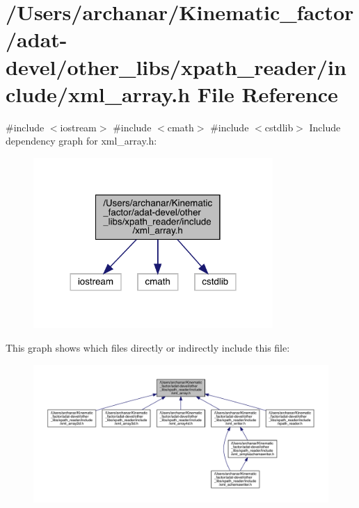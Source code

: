 \hypertarget{adat-devel_2other__libs_2xpath__reader_2include_2xml__array_8h}{}\section{/\+Users/archanar/\+Kinematic\+\_\+factor/adat-\/devel/other\+\_\+libs/xpath\+\_\+reader/include/xml\+\_\+array.h File Reference}
\label{adat-devel_2other__libs_2xpath__reader_2include_2xml__array_8h}
{\ttfamily \#include $<$iostream$>$}\newline
{\ttfamily \#include $<$cmath$>$}\newline
{\ttfamily \#include $<$cstdlib$>$}\newline
Include dependency graph for xml\+\_\+array.\+h\+:
\nopagebreak
\begin{figure}[H]
\begin{center}
\leavevmode
\includegraphics[width=258pt]{dc/d8f/adat-devel_2other__libs_2xpath__reader_2include_2xml__array_8h__incl}
\end{center}
\end{figure}
This graph shows which files directly or indirectly include this file\+:
\nopagebreak
\begin{figure}[H]
\begin{center}
\leavevmode
\includegraphics[width=350pt]{d2/df1/adat-devel_2other__libs_2xpath__reader_2include_2xml__array_8h__dep__incl}
\end{center}
\end{figure}
